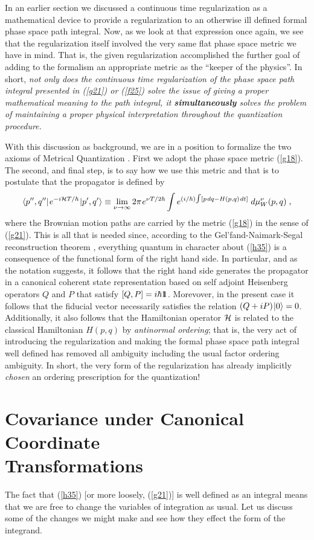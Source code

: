 \documentclass[12pt]{article}
\def\one{1\hskip-.37em 1}
\def\H{{\cal H}}
\def\ra{\rightarrow}
\def\tint{{\textstyle\int}}
\def\s{\hskip.08em}
\def\bn{\begin{eqnarray}}     %
\def\en{\end{eqnarray}}       %
\def\<{\langle}
\def\>{\rangle}
\begin{document}
In an earlier section we discussed a continuous time regularization as a 
mathematical device to provide a regularization to an otherwise ill 
defined formal phase space path integral. Now, as we look at that 
expression once again, we see that the regularization itself involved the 
very same flat phase space metric we have in mind. That is, the given 
regularization accomplished the further goal of adding to the formalism an 
appropriate metric as the ``keeper of the physics''. In short, {\it not 
only does the continuous time regularization of the phase space path 
integral presented in (\ref{g21}) or (\ref{f25}) solve the issue of giving 
a proper mathematical meaning to the path integral, it {\bf simultaneously} 
solves the problem of maintaining a proper physical interpretation 
throughout the quantization procedure.} 

With this discussion as background, we are in a position to formalize the 
two axioms of Metrical Quantization \cite{swe}. First we adopt the phase 
space metric (\ref{g18}). The second, and final step, is to say how we 
use this metric and that is to postulate that the propagator is defined by 
  \bn \<p'',q''|\s e^{-i\H T/\hbar}\s|p',q'\>\equiv
\lim_{\nu\ra\infty}2\pi\s e^{\nu T/2\hbar}\int 
e^{(i/\hbar)\tint[p\s dq-H(p,q)\s dt]}\;d\mu^\nu_W(p,q)\;, \label{h35}\en
where the Brownian motion paths are carried by the metric (\ref{g18}) in 
the sense of (\ref{g21}).
This is all that is needed since, according to the Gel'fand-Naimark-Segal 
reconstruction theorem \cite{emch}, everything quantum in character about 
(\ref{h35}) is a consequence of the functional form of the right hand side. 
In particular, and as the notation suggests, it follows that the right hand 
side generates the propagator in a canonical coherent state representation 
based on self adjoint Heisenberg operators $Q$ and $P$ that satisfy 
$[Q,P]=i\hbar\one$. Morevover, in the present case it follows that the 
fiducial vector necessarily satisfies the relation $(Q+iP)\s|0\>=0$. 
Additionally, it also follows that the Hamiltonian operator $\H$ is 
related to the classical Hamiltonian $H(p,q)$ by 
{\it antinormal ordering\/}; that is, the very act of introducing the 
regularization and making the formal phase space path integral well 
defined has removed all ambiguity including the usual factor ordering 
ambiguity. In short, the very form of the regularization has already 
implicitly {\it chosen} an ordering prescription for the quantization!

\section{Covariance under Canonical Coordinate \\Transformations}
The fact that (\ref{h35}) [or more loosely, (\ref{g21})] is well defined 
as an integral means that we are free to change the variables of 
integration as usual. Let us discuss some of the changes we might make 
and see how they effect the form of the integrand. 
\end{document}
